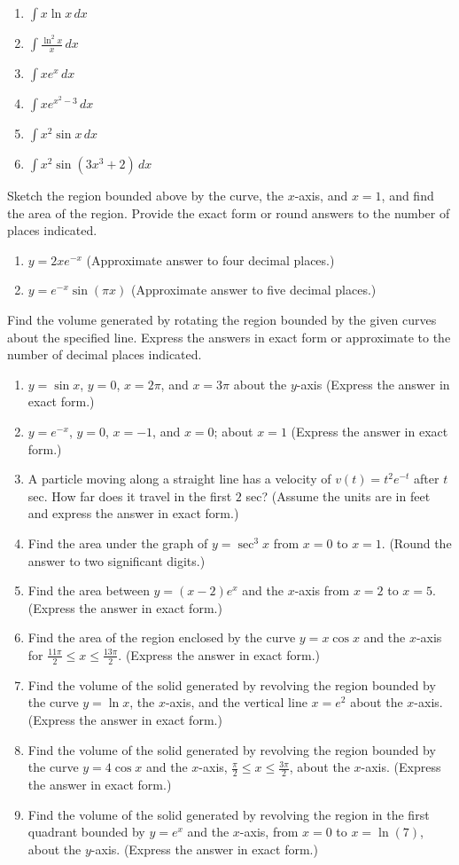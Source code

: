 \documentclass{exercises}
\begin{document}
\begin{enumerate}[resume]
\item $\int x\ln x\,dx$
\item $\int \frac{\ln^{2}x}{x}\,dx$
\item $\int xe^{x}\,dx$
\item $\int xe^{x^{2}-3}\,dx$
\item $\int x^{2}\sin x\,dx$
\item $\int x^{2}\sin(3x^{3}+2)\,dx$
\end{enumerate}

Sketch the region bounded above by the curve, the $x$-axis, and $x=1$, and find the area of the region. Provide the exact form or round answers to the number of places indicated.

\begin{enumerate}[resume]
\item $y=2xe^{-x}$ (Approximate answer to four decimal places.)
\item $y=e^{-x}\sin(\pi x)$ (Approximate answer to five decimal places.)
\end{enumerate}

Find the volume generated by rotating the region bounded by the given curves about the specified line. Express the answers in exact form or approximate to the number of decimal places indicated.

\begin{enumerate}[resume]
\item $y=\sin x$, $y=0$, $x=2\pi$, and $x=3\pi$ about the $y$-axis (Express the answer in exact form.)
\item $y=e^{-x}$, $y=0$, $x=-1$, and $x=0$; about $x=1$ (Express the answer in exact form.)
\item A particle moving along a straight line has a velocity of $v(t)=t^{2}e^{-t}$ after $t$ sec. How far does it travel in the first $2$ sec? (Assume the units are in feet and express the answer in exact form.)
\item Find the area under the graph of $y=\sec^{3}x$ from $x=0$ to $x=1$. (Round the answer to two significant digits.)
\item Find the area between $y=(x-2)e^{x}$ and the $x$-axis from $x=2$ to $x=5$. (Express the answer in exact form.)
\item Find the area of the region enclosed by the curve $y=x\cos x$ and the $x$-axis for $\frac{11\pi}{2}\le x\le \frac{13\pi}{2}$. (Express the answer in exact form.)
\item Find the volume of the solid generated by revolving the region bounded by the curve $y=\ln x$, the $x$-axis, and the vertical line $x=e^{2}$ about the $x$-axis. (Express the answer in exact form.)
\item Find the volume of the solid generated by revolving the region bounded by the curve $y=4\cos x$ and the $x$-axis, $\frac{\pi}{2}\le x\le \frac{3\pi}{2}$, about the $x$-axis. (Express the answer in exact form.)
\item Find the volume of the solid generated by revolving the region in the first quadrant bounded by $y=e^{x}$ and the $x$-axis, from $x=0$ to $x=\ln(7)$, about the $y$-axis. (Express the answer in exact form.)
\end{enumerate}
\end{document}
